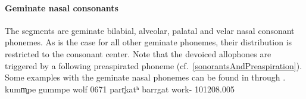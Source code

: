 \paragraph{Geminate nasal consonants}
The segments  are geminate bilabial, alveolar, palatal and velar nasal consonant phonemes. 
As is the case for all other geminate phonemes, their distribution is restricted to the consonant center. 
Note that the devoiced allophones are triggered by a following preaspirated phoneme (cf.~\SEC\ref{sonorantsAndPreaspiration}). 
Some examples with the geminate nasal phonemes can be found in  through .
	{ku{mm̥}pe}	{gummpe}	{wolf\BS{}}		{0671}
	{pa{rr̥}katʰ}	{barrgat}	{work-}			{101208}{.005}


